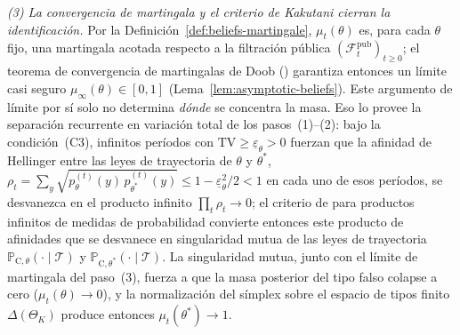 \documentclass[review,authoryear,12pt]{elsarticle}
\theoremstyle{plain}
\theoremstyle{definition}
\newcommand{\ProbC}[1]{\mathbb{P}_{\mathrm{C},#1}}
\newcommand{\ThetaK}{\Theta_K}
\newcommand{\1}{\mathbf{1}}
\begin{document}
\emph{(3) La convergencia de martingala y el criterio de Kakutani cierran la identificación.} Por la Definición~\ref{def:beliefs-martingale}, $\mu_t(\theta)$ es, para cada $\theta$ fijo, una martingala acotada respecto a la filtración pública $(\mathcal F_t^{\mathrm{pub}})_{t\ge0}$; el teorema de convergencia de martingalas de Doob (\citealt{Doob1953Stochastic}) garantiza entonces un límite casi seguro $\mu_\infty(\theta)\in[0,1]$ (Lema~\ref{lem:asymptotic-beliefs}). Este argumento de límite por sí solo no determina \emph{dónde} se concentra la masa. Eso lo provee la separación recurrente en variación total de los pasos~(1)--(2): bajo la condición~(C3), infinitos períodos con $\mathrm{TV}\ge\underline\varepsilon_\theta>0$ fuerzan que la afinidad de Hellinger entre las leyes de trayectoria de $\theta$ y $\theta^\ast$, $\rho_t=\sum_y\sqrt{p_\theta^{(t)}(y)\,p_{\theta^\ast}^{(t)}(y)}\le 1-\underline\varepsilon_\theta^2/2<1$ en cada uno de esos períodos, se desvanezca en el producto infinito $\prod_t\rho_t\to0$; el criterio de \citet{Kakutani1948} para productos infinitos de medidas de probabilidad convierte entonces este producto de afinidades que se desvanece en singularidad mutua de las leyes de trayectoria $\ProbC\theta(\cdot\mid\mathcal T)$ y $\ProbC{\theta^\ast}(\cdot\mid\mathcal T)$. La singularidad mutua, junto con el límite de martingala del paso~(3), fuerza a que la masa posterior del tipo falso colapse a cero ($\mu_t(\theta)\to0$), y la normalización del símplex sobre el espacio de tipos finito $\Delta(\ThetaK)$ produce entonces $\mu_t(\theta^\ast)\to1$.
\end{document}
